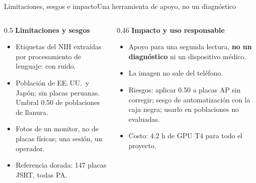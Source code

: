 \documentclass[aspectratio=169,10pt]{beamer}
\begin{document}
\begin{frame}{Limitaciones, sesgos e impacto}{Una herramienta de apoyo, no un diagnóstico}
\begin{columns}[T]
\begin{column}{0.5\textwidth}
\textbf{Limitaciones y sesgos}
\begin{itemize}\small
\item Etiquetas del NIH extraídas por procesamiento de lenguaje: con ruido.
\item Población de EE.\,UU.\ y Japón; sin placas peruanas. Umbral 0.50 de poblaciones de llanura.
\item Fotos de un monitor, no de placas físicas; una sesión, un operador.
\item Referencia dorada: 147 placas JSRT, todas PA.
\end{itemize}
\end{column}
\begin{column}{0.46\textwidth}
\textbf{Impacto y uso responsable}
\begin{itemize}\small
\item Apoyo para una segunda lectura, \textbf{no un diagnóstico} ni un dispositivo médico.
\item La imagen no sale del teléfono.
\item Riesgos: aplicar 0.50 a placas AP sin corregir; sesgo de automatización con la caja negra; usarlo en
  poblaciones no evaluadas.
\item Costo: 4.2 h de GPU T4 para todo el proyecto.
\end{itemize}
\end{column}
\end{columns}
\end{frame}
\end{document}
